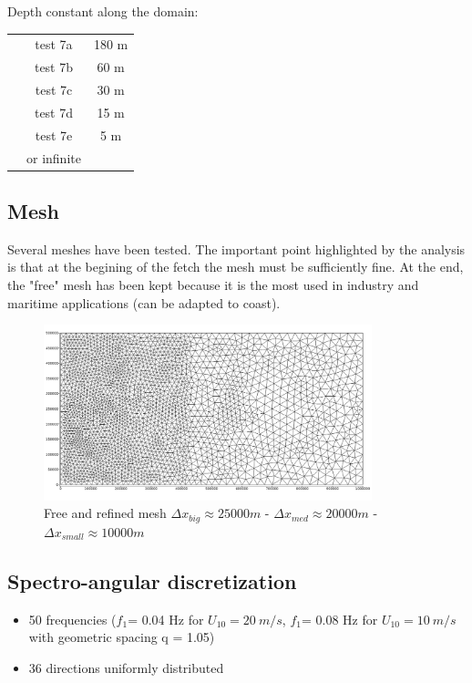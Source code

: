 Depth constant along the domain:
\begin{tabular}{ccc}
 & test 7a & 180 m\\
 & test 7b & 60 m\\
& test 7c & 30 m\\
& test 7d & 15 m\\
& test 7e & 5 m\\
 & or infinite\\
\end{tabular}
\subsection{Mesh}
Several meshes have been tested. The important point highlighted by the analysis is that at the begining of the fetch the mesh must be sufficiently fine. At the end, the "free" mesh has been kept because it is the most used in industry and maritime applications (can be adapted to coast).
\begin{figure}[H]
\centering
\includegraphics[width=0.85\textwidth]{freemesh.png}
\caption{Free and refined mesh $\Delta x_{big} \approx 25 000 m$ - $\Delta x_{med} \approx 20 000 m$ - $\Delta x_{small} \approx 10 000 m$}
\label{meshfet}
\end{figure}

\subsection{Spectro-angular discretization}
\begin{itemize}
\item 50 frequencies ($f_1 $= 0.04 Hz for $U_{10} = 20~m/s$, $f_1 $= 0.08 Hz for $U_{10} = 10~m/s$ with geometric spacing q = 1.05)
\item 36 directions uniformly distributed
\end{itemize}

